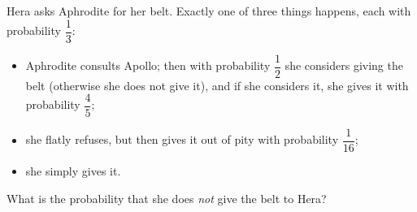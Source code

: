 Hera asks Aphrodite for her belt. Exactly one of three things happens, each with probability $\dfrac13$:
\begin{itemize}
\item Aphrodite consults Apollo; then with probability $\dfrac12$ she considers giving the belt (otherwise she does not give it), and if she considers it, she gives it with probability $\dfrac45$;
\item she flatly refuses, but then gives it out of pity with probability $\dfrac1{16}$;
\item she simply gives it.
\end{itemize}
What is the probability that she does \emph{not} give the belt to Hera?
